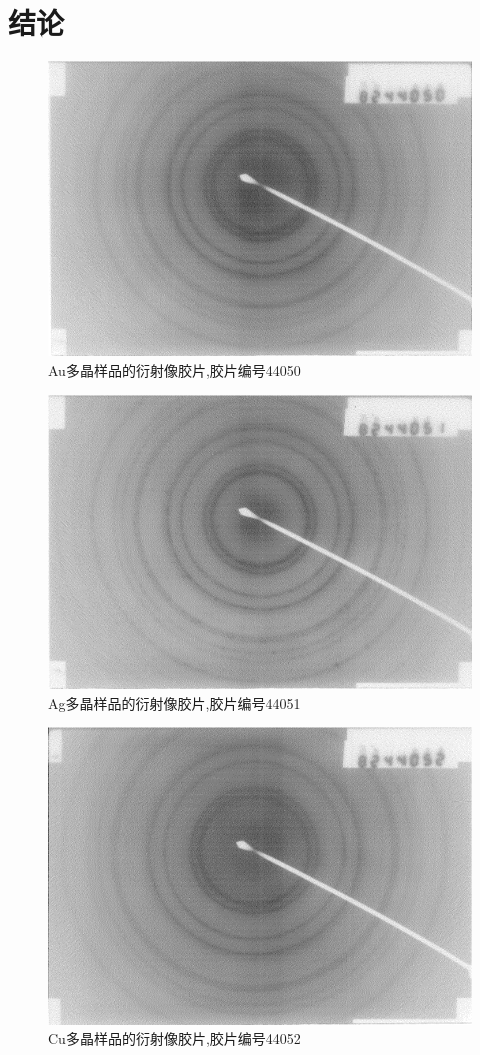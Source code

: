 \documentclass[aps,pre,12pt,preprint,onecolumn,showpacs,showkeys]{revtex4-1}
\begin{document}
\section{结论}
\begin{figure}[htbp]
  \centering
\includegraphics[width=.7\textwidth]{1.pdf}
\caption{\label{fig:2}%
    Au多晶样品的衍射像胶片,胶片编号44050
}
\end{figure}
\begin{figure}[htbp]
  \centering
\includegraphics[width=.7\textwidth]{3.pdf}
\caption{\label{fig:3}%
    Ag多晶样品的衍射像胶片,胶片编号44051
}
\end{figure}
\begin{figure}[htbp]
  \centering
\includegraphics[width=.7\textwidth]{5.pdf}
\caption{\label{fig:4}%
    Cu多晶样品的衍射像胶片,胶片编号44052
}
\end{figure}
\end{document}
